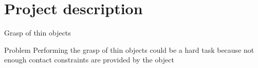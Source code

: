 \section{Project description}

\begin{frame}{Grasp of thin objects}
  \vskip 0.1in
    \begin{alertblock}{Problem}
      Performing the grasp of thin objects could be a hard task
      because not enough contact constraints are provided by the object
    \end{alertblock}
    \begin{center}
    \end{center}
\end{frame}


